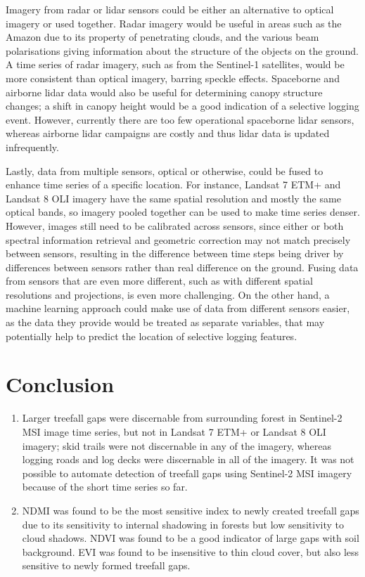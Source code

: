 \documentclass[a4paper,12pt]{scrbook}
\begin{document}
Imagery from radar or lidar sensors could be either an alternative to optical imagery or used together. Radar imagery would be useful in areas such as the Amazon due to its property of penetrating clouds, and the various beam polarisations giving information about the structure of the objects on the ground. A time series of radar imagery, such as from the Sentinel-1 satellites, would be more consistent than optical imagery, barring speckle effects. Spaceborne and airborne lidar data would also be useful for determining canopy structure changes; a shift in canopy height would be a good indication of a selective logging event. However, currently there are too few operational spaceborne lidar sensors, whereas airborne lidar campaigns are costly and thus lidar data is updated infrequently.

Lastly, data from multiple sensors, optical or otherwise, could be fused to enhance time series of a specific location. For instance, Landsat 7 \ac{ETM+} and Landsat 8 \ac{OLI} imagery have the same spatial resolution and mostly the same optical bands, so imagery pooled together can be used to make time series denser. However, images still need to be calibrated across sensors, since either or both spectral information retrieval and geometric correction may not match precisely between sensors, resulting in the difference between time steps being driver by differences between sensors rather than real difference on the ground. Fusing data from sensors that are even more different, such as with different spatial resolutions and projections, is even more challenging. On the other hand, a machine learning approach could make use of data from different sensors easier, as the data they provide would be treated as separate variables, that may potentially help to predict the location of selective logging features.

\chapter{Conclusion}

\begin{enumerate}
 \item Larger treefall gaps were discernable from surrounding forest in Sentinel-2 \ac{MSI} image time series, but not in Landsat 7 \ac{ETM+} or Landsat 8 \ac{OLI} imagery; skid trails were not discernable in any of the imagery, whereas logging roads and log decks were discernable in all of the imagery. It was not possible to automate detection of treefall gaps using Sentinel-2 \ac{MSI} imagery because of the short time series so far.
 \item \ac{NDMI} was found to be the most sensitive index to newly created treefall gaps due to its sensitivity to internal shadowing in forests but low sensitivity to cloud shadows. \ac{NDVI} was found to be a good indicator of large gaps with soil background. \ac{EVI} was found to be insensitive to thin cloud cover, but also less sensitive to newly formed treefall gaps.
\end{enumerate}
\end{document}
